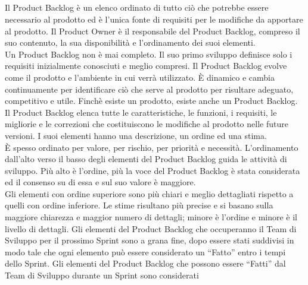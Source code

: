 \subsection*{\color{SteelBlue}{Product Backlog}}
\label{sec:product_backlog}
Il Product Backlog \`e un elenco ordinato di tutto ciò che potrebbe essere necessario al prodotto ed \`e l'unica fonte di 
requisiti per le modifiche da apportare al prodotto. Il Product Owner \`e il responsabile del Product Backlog, compreso il suo 
contenuto, la sua disponibilità e l'ordinamento dei suoi elementi. \newline
\\Un Product Backlog non \`e mai completo. Il suo primo sviluppo definisce solo i requisiti inizialmente conosciuti e 
meglio compresi. Il Product Backlog evolve come il prodotto e l'ambiente in cui verrà utilizzato. \`E dinamico e cambia 
continuamente per identificare ci\`o che serve al prodotto per risultare adeguato, competitivo e utile. Finch\`e esiste un 
prodotto, esiste anche un Product Backlog. \newline
\\Il Product Backlog elenca tutte le caratteristiche, le funzioni, i requisiti, le migliorie e le correzioni che costituiscono 
le modifiche al prodotto nelle future versioni. I suoi elementi hanno una descrizione, un ordine ed una stima. \newline
\\ \`E spesso ordinato per valore, per rischio, per priorità e necessità. L'ordinamento dall'alto verso il basso degli 
elementi del Product Backlog guida le attività di sviluppo. Pi\`u alto \`e l'ordine, pi\`u la voce del Product Backlog \`e 
stata considerata ed il consenso su di essa e sul suo valore \`e maggiore. \newline
\\Gli elementi con ordine superiore sono pi\`u chiari e meglio dettagliati rispetto a quelli con ordine inferiore. Le stime 
risultano pi\`u precise e si basano sulla maggiore chiarezza e maggior numero di dettagli; minore è l'ordine e minore \`e il 
livello di dettagli. Gli elementi del Product Backlog che occuperanno il Team di Sviluppo per il prossimo Sprint sono a grana 
fine, dopo essere stati suddivisi in modo tale che ogni elemento pu\`o essere considerato un ``Fatto'' entro i tempi dello 
Sprint. Gli elementi del Product Backlog che possono essere ``Fatti'' dal Team di Sviluppo durante un Sprint sono considerati 
